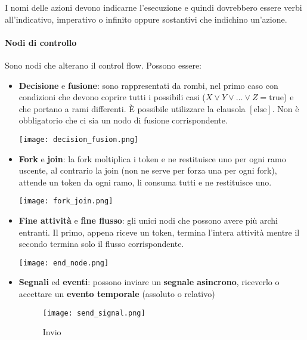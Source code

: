 \begin{note}
	I nomi delle azioni devono indicarne l'esecuzione e quindi dovrebbero essere verbi all'indicativo, imperativo o infinito oppure sostantivi che indichino un'azione.
\end{note}

\paragraph{Nodi di controllo} Sono nodi che alterano il control flow. Possono essere:
\begin{itemize}
	\item \textbf{Decisione} e \textbf{fusione}: sono rappresentati da rombi, nel primo caso con condizioni che devono coprire tutti i possibili casi ($X \lor Y \lor \ldots \lor Z = \text{true}$) e che portano a rami differenti. È possibile utilizzare la clausola \textit{$[\text{else}]$}. Non è obbligatorio che ci sia un nodo di fusione corrispondente.
	\begin{center}
		\texttt{[image: decision\_fusion.png]}
	\end{center}
	\item \textbf{Fork} e \textbf{join}: la fork moltiplica i token e ne restituisce uno per ogni ramo uscente, al contrario la join (non ne serve per forza una per ogni fork), attende un token da ogni ramo, li consuma tutti e ne restituisce uno.
	\begin{center}
		\texttt{[image: fork\_join.png]}
	\end{center}
	\item \textbf{Fine attività} e \textbf{fine flusso}: gli unici nodi che possono avere più archi entranti. Il primo, appena riceve un token, termina l'intera attività mentre il secondo termina solo il flusso corrispondente.
	\begin{center}
		\texttt{[image: end\_node.png]}
	\end{center}
	\newpage
	\item \textbf{Segnali} ed \textbf{eventi}: possono inviare un \textbf{segnale asincrono}, riceverlo o accettare un \textbf{evento temporale} (assoluto o relativo)
	\begin{figure}[!h]
		\centering
		\begin{minipage}[b]{0.2\textwidth}
			\texttt{[image: send\_signal.png]}
			\caption*{Invio}
		\end{minipage}
		\hspace{0.1\textwidth}
		\begin{minipage}[b]{0.2\textwidth}

\end{minipage}
\end{figure}
\end{itemize}
